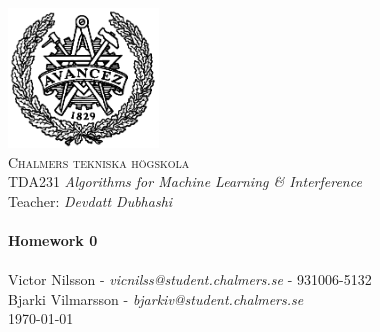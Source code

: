 
\begin{titlepage}
\begin{center}


~\\[1.0cm]
 \includegraphics[width=0.3\textwidth]{Figures/chalmers.png}~\\[1.0cm]

\textsc{\LARGE Chalmers tekniska högskola}\\[0.3cm]
TDA231 \textit{Algorithms for Machine Learning \& Interference}\\
Teacher: \textit{Devdatt Dubhashi} \\

\HRule \\[0.3cm]
{ \huge \bfseries Homework 0 \\[0.3cm] }
\HRule \\[0.3cm]

Victor Nilsson  -  \textit{vicnilss@student.chalmers.se} - 931006-5132\\ [0.3cm]
Bjarki Vilmarsson  -  \textit{bjarkiv@student.chalmers.se}\\ [0.3cm]


\vfill
{\large \today}

\end{center}
\end{titlepage}

\newpage